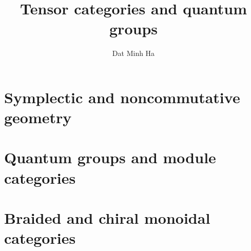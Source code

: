 

\setcounter{section}{-1}





	\title{Tensor categories and quantum groups}
	
	\author{Dat Minh Ha}
	\maketitle
	
	\begin{abstract}
	    
	\end{abstract}
	
	{
      \hypersetup{} 
      \dominitoc
      \tableofcontents %
    }
    
    \chapter{Symplectic and noncommutative geometry}
        \begin{abstract}
            
        \end{abstract}
        
        \minitoc
        
        
        
        
    
    \chapter{Quantum groups and module categories}
        \begin{abstract}
            
        \end{abstract}
        
        \minitoc
        
        
    
    \chapter{Braided and chiral monoidal categories}
        \begin{abstract}
            
        \end{abstract}
        
